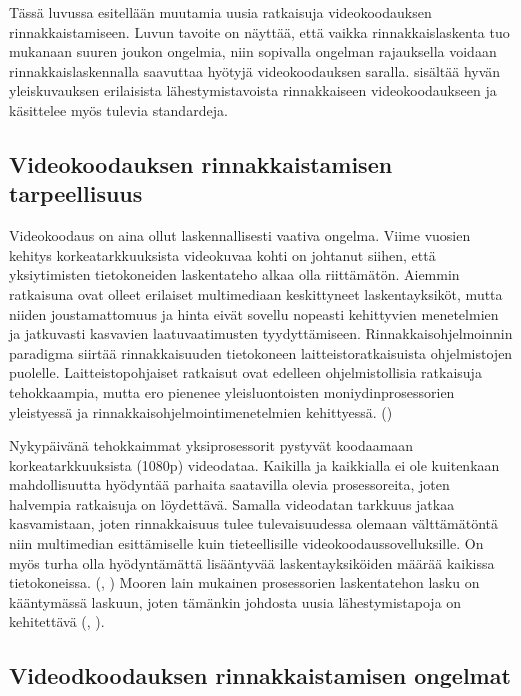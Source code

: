Tässä luvussa esitellään muutamia uusia ratkaisuja videokoodauksen
rinnakkaistamiseen. Luvun tavoite on näyttää, että vaikka rinnakkaislaskenta
tuo mukanaan suuren joukon ongelmia, niin sopivalla ongelman rajauksella
voidaan rinnakkaislaskennalla saavuttaa hyötyjä videokoodauksen saralla.
\citealt{chi} sisältää hyvän yleiskuvauksen erilaisista lähestymistavoista
rinnakkaiseen videokoodaukseen ja käsittelee myös tulevia standardeja.

\subsection{Videokoodauksen rinnakkaistamisen tarpeellisuus}

Videokoodaus on aina ollut laskennallisesti vaativa ongelma. Viime vuosien
kehitys korkeatarkkuuksista videokuvaa kohti on johtanut siihen, että
yksiytimisten tietokoneiden laskentateho alkaa olla riittämätön.
Aiemmin ratkaisuna ovat olleet erilaiset multimediaan keskittyneet
laskentayksiköt, mutta niiden joustamattomuus ja hinta eivät sovellu nopeasti
kehittyvien menetelmien ja jatkuvasti kasvavien laatuvaatimusten tyydyttämiseen.
Rinnakkaisohjelmoinnin paradigma siirtää rinnakkaisuuden tietokoneen
laitteistoratkaisuista ohjelmistojen puolelle. Laitteistopohjaiset ratkaisut
ovat edelleen ohjelmistollisia ratkaisuja tehokkaampia, mutta ero pienenee
yleisluontoisten moniydinprosessorien yleistyessä ja
rinnakkaisohjelmointimenetelmien kehittyessä. (\citealt{choi})

Nykypäivänä tehokkaimmat yksiprosessorit pystyvät koodaamaan
korkeatarkkuuksista (1080p) videodataa. Kaikilla ja kaikkialla ei ole
kuitenkaan mahdollisuutta hyödyntää parhaita saatavilla olevia prosessoreita,
joten halvempia ratkaisuja on löydettävä. Samalla videodatan tarkkuus jatkaa
kasvamistaan, joten rinnakkaisuus tulee tulevaisuudessa olemaan välttämätöntä
niin multimedian esittämiselle kuin tieteellisille videokoodaussovelluksille.
On myös turha olla hyödyntämättä lisääntyvää laskentayksiköiden määrää kaikissa
tietokoneissa. (\citealt{chi}, \citealt{xu}) Mooren lain mukainen prosessorien
laskentatehon lasku on kääntymässä laskuun, joten tämänkin johdosta uusia
lähestymistapoja on kehitettävä (\citealt{moore}, \citealt{vajda}).

\subsection{Videodkoodauksen rinnakkaistamisen ongelmat}
\label{sec:problems}

